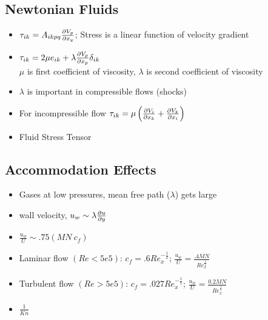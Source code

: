 \documentclass[a4paper]{article}
\begin{document}
    \subsection{Newtonian Fluids}
    \begin{itemize}

        \item $\tau_{ik} = A_{ikpq} \frac{\partial V_p}{\partial x_q}$; Stress is a linear function of velocity gradient
        \item $\tau_{ik} = 2 \mu e_{ik} + \lambda \frac{\partial V_p}{\partial x_p}\delta_{ik}$ \\ 
        $\mu$ is first coefficient of viscosity, $\lambda$ is second coefficient of viscosity
        \item $\lambda$ is important in compressible flows (shocks)
        \item For incompressible flow $\tau_{ik} = \mu \left( \frac{\partial V_i}{\partial x_k} + \frac{\partial V_k}{\partial x_i} \right)$
        \item Fluid Stress Tensor
    \end{itemize}

    \subsection{Accommodation Effects}
    \begin{itemize}
        \item Gases at low pressures, mean free path ($\lambda$) gets large
        \item wall velocity, $u_w \sim \lambda \frac{\partial u}{\partial y}$
        \item $\frac{u_w}{U} \sim .75 \left(MN\ c_f\right)$
        \item Laminar flow $(Re < 5e5)$: $c_f = .6 Re_x^{-\frac{1}{2}}$; $\frac{u_w}{U} = \frac{.4 MN}{Re_x^{\frac{1}{2}}}$
        \item Turbulent flow $(Re > 5e5)$: $c_f = .027 Re_x^{-\frac{1}{7}}$; $\frac{u_w}{U} = \frac{0.2 MN}{Re_x^{\frac{1}{7}}}$
        \item $\frac{1}{Kn}$
    \end{itemize}
\end{document}
